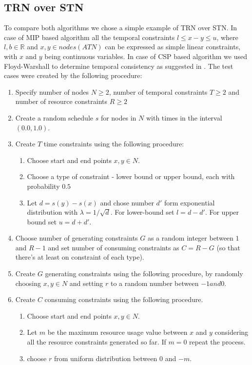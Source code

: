 \subsection{TRN over STN}
To compare both algorithms we chose a simple example of TRN over STN. In case of MIP based algorithm all the temporal constraints $l \leq x - y \leq u$, where $l,b \in \mathbb{R}$ and $x,y \in nodes(ATN)$ can be expressed as simple linear constraints, with $x$ and $y$ being continuous variables. In case of CSP based algorithm we used Floyd-Warshall to determine temporal consistency as suggested in \cite{dechter1991temporal}. The test cases were created by the following procedure:
\begin{enumerate}
\item Specify number of nodes $N \geq 2$, number of temporal constraints $T\geq 2$ and number of resource constraints $R\geq 2$
\item Create a random schedule $s$ for nodes in $N$ with times in the interval $(0.0, 1.0)$.
\item Create $T$ time constraints using the following procedure:
  \begin{enumerate}
  \item Choose start and end points $x,y \in N$.
  \item Choose a type of constraint - lower bound or upper bound, each with probability $0.5$
  \item Let $d=s(y) - s(x)$ and chose number $d'$ form exponential distribution with $\lambda = 1 / \sqrt{d}$. For lower-bound set $l = d - d'$. For upper bound set $u = d + d'$.
  \end{enumerate}
\item Choose number of generating constraints $G$ as a random integer between $1$ and $R-1$ and set number of consuming constraints as $C = R - G$ (so that there's at least on constraint of each type).
\item Create $G$ generating constraints using the following procedure, by randomly choosing $x,y \in N$ and setting $r$ to a random number between $-1 and 0$.
\item Create $C$ consuming constraints using the following procedure.
  \begin{enumerate}
  \item Choose start and end points $x,y \in N$.
  \item Let $m$ be the maximum resource usage value between $x$ and $y$ considering all the resource constraints generated so far. If $m = 0$ repeat the process.
  \item choose $r$ from uniform distribution between $0$ and $-m$.
  \end{enumerate}
\end{enumerate}

